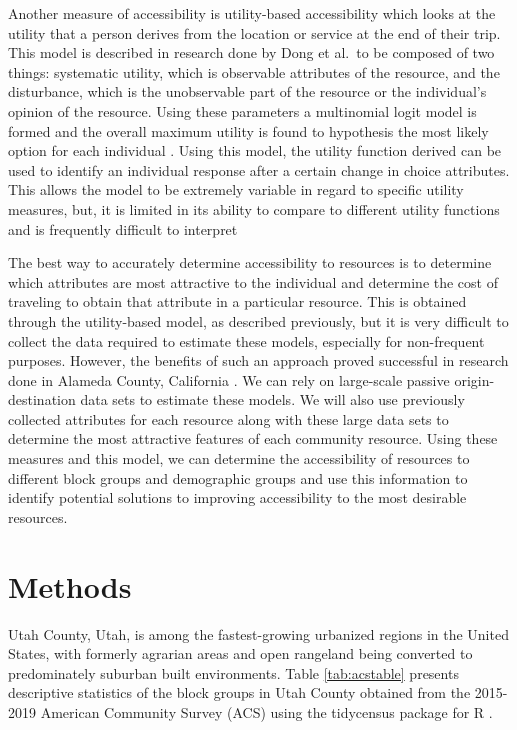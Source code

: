 \documentclass[3p, authoryear]{elsarticle} %
\begin{document}
Another measure of accessibility is utility-based accessibility which looks at
the utility that a person derives from the location or service at the end of
their trip. This model is described in research done by Dong et al.~to be
composed of two things: systematic utility, which is observable attributes of
the resource, and the disturbance, which is the unobservable part of the
resource or the individual's opinion of the resource. Using these parameters a
multinomial logit model is formed and the overall maximum utility is found to
hypothesis the most likely option for each individual \citep{dong2006moving}. Using
this model, the utility function derived can be used to identify an individual
response after a certain change in choice attributes. This allows the model to
be extremely variable in regard to specific utility measures, but, it is limited
in its ability to compare to different utility functions and is frequently
difficult to interpret \citep{handy1997measuring}

The best way to accurately determine accessibility to resources is to determine
which attributes are most attractive to the individual and determine the cost of
traveling to obtain that attribute in a particular resource. This is obtained
through the utility-based model, as described previously, but it is very
difficult to collect the data required to estimate these models, especially for
non-frequent purposes. However, the benefits of such an approach proved
successful in research done in Alameda County, California \citep{macfarlane2020modeling}. We can rely on large-scale passive origin-destination data sets to
estimate these models. We will also use previously collected attributes for each
resource along with these large data sets to determine the most attractive
features of each community resource. Using these measures and this model, we can
determine the accessibility of resources to different block groups and
demographic groups and use this information to identify potential solutions to
improving accessibility to the most desirable resources.

\hypertarget{methods}{%
\section{Methods}\label{methods}}

Utah County, Utah, is among the fastest-growing urbanized regions in the United
States, with formerly agrarian areas and open rangeland being converted to
predominately suburban built environments. Table \ref{tab:acstable} presents
descriptive statistics of the block groups in Utah County obtained from the
2015-2019 American Community Survey (ACS) using the tidycensus package for R
\citep{tidycensus}.
\end{document}
